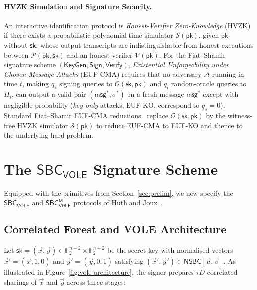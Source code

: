 \documentclass[11pt,a4paper]{article}
\theoremstyle{definition}
\theoremstyle{remark}
\newcommand{\Ftwo}{\mathbb{F}_2}
\newcommand{\NSBC}{\mathsf{NSBC}}
\newcommand{\SBCVOLE}{\mathsf{SBC}_{\mathsf{VOLE}}}
\newcommand{\SBCVOLEM}{\mathsf{SBC}_{\mathsf{VOLE}}^{\mathsf{M}}}
\newcommand{\pk}{\mathsf{pk}}
\newcommand{\sk}{\mathsf{sk}}
\newcommand{\msg}{\mathsf{msg}}
\begin{document}
\paragraph{HVZK Simulation and Signature Security.}
An interactive identification protocol is \emph{Honest-Verifier Zero-Knowledge} (HVZK) if there exists a probabilistic polynomial-time simulator $\mathcal{S}(\pk)$, given $\pk$ without $\sk$, whose output transcripts are indistinguishable from honest executions between $\mathcal{P}(\pk, \sk)$ and an honest verifier $\mathcal{V}(\pk)$. For the Fiat--Shamir signature scheme $(\mathsf{KeyGen}, \mathsf{Sign}, \mathsf{Verify})$, \emph{Existential Unforgeability under Chosen-Message Attacks} (EUF-CMA) requires that no adversary $\mathcal{A}$ running in time $t$, making $q_s$ signing queries to $\mathcal{O}(\sk, \pk)$ and $q_i$ random-oracle queries to $H_i$, can output a valid pair $(\msg^*, \sigma^*)$ on a fresh message $\msg^*$ except with negligible probability (\emph{key-only} attacks, EUF-KO, correspond to $q_s = 0$). Standard Fiat--Shamir EUF-CMA reductions~\cite{HJ24,HJ25} replace $\mathcal{O}(\sk, \pk)$ by the witness-free HVZK simulator $\mathcal{S}(\pk)$ to reduce EUF-CMA to EUF-KO and thence to the underlying hard problem.

\section{The \texorpdfstring{$\SBCVOLE$}{SBC\_VOLE} Signature Scheme}
\label{sec:protocol}

Equipped with the primitives from Section~\ref{sec:prelim}, we now specify the $\SBCVOLE$ and $\SBCVOLEM$ protocols of Huth and Joux~\cite[Sections~3--6]{HJ25}.

\subsection{Correlated Forest and VOLE Architecture}
\label{subsec:ggm-vole-arch}
Let $\sk = (\vec{x}, \vec{y}) \in \Ftwo^{n-2} \times \Ftwo^{n-2}$ be the secret key with normalised vectors $\vec{x}' = (\vec{x}, 1, 0)$ and $\vec{y}' = (\vec{y}, 0, 1)$ satisfying $(\vec{x}', \vec{y}') \in \NSBC[\vec{u}, \vec{v}]$. As illustrated in Figure~\ref{fig:vole-architecture}, the signer prepares $\tau D$ correlated sharings of $\vec{x}$ and $\vec{y}$ across three stages:
\end{document}
